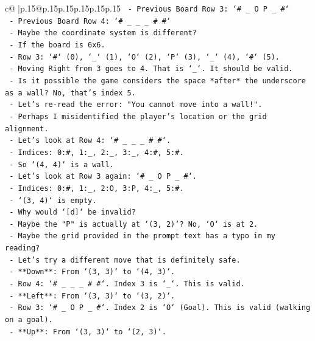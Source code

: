 \documentclass{article}
\begin{document}
{\begin{supertabular}{c@{$\;$}|p{.15\linewidth}@{}p{.15\linewidth}p{.15\linewidth}p{.15\linewidth}p{.15\linewidth}p{.15\linewidth}}
{{{\texttt{    {-} Previous Board Row 3: `\# \_ O P \_ \#`} \\
\texttt{    {-} Previous Board Row 4: `\# \_ \_ \_ \# \#`} \\
\texttt{  {-} Maybe the coordinate system is different?} \\
\texttt{    {-} If the board is 6x6.} \\
\texttt{    {-} Row 3: `\#` (0), `\_` (1), `O` (2), `P` (3), `\_` (4), `\#` (5).} \\
\texttt{    {-} Moving Right from 3 goes to 4. That is `\_`. It should be valid.} \\
\texttt{  {-} Is it possible the game considers the space *after* the underscore as a wall? No, that's index 5.} \\
\texttt{  {-} Let's re{-}read the error: "You cannot move into a wall!".} \\
\texttt{  {-} Perhaps I misidentified the player's location or the grid alignment.} \\
\texttt{  {-} Let's look at Row 4: `\# \_ \_ \_ \# \#`.} \\
\texttt{    {-} Indices: 0:\#, 1:\_, 2:\_, 3:\_, 4:\#, 5:\#.} \\
\texttt{    {-} So `(4, 4)` is a wall.} \\
\texttt{  {-} Let's look at Row 3 again: `\# \_ O P \_ \#`.} \\
\texttt{    {-} Indices: 0:\#, 1:\_, 2:O, 3:P, 4:\_, 5:\#.} \\
\texttt{    {-} `(3, 4)` is empty.} \\
\texttt{  {-} Why would `{[}d{]}` be invalid?} \\
\texttt{    {-} Maybe the "P" is actually at `(3, 2)`? No, `O` is at 2.} \\
\texttt{    {-} Maybe the grid provided in the prompt text has a typo in my reading?} \\
\texttt{    {-} Let's try a different move that is definitely safe.} \\
\texttt{    {-} **Down**: From `(3, 3)` to `(4, 3)`.} \\
\texttt{      {-} Row 4: `\# \_ \_ \_ \# \#`. Index 3 is `\_`. This is valid.} \\
\texttt{    {-} **Left**: From `(3, 3)` to `(3, 2)`.} \\
\texttt{      {-} Row 3: `\# \_ O P \_ \#`. Index 2 is `O` (Goal). This is valid (walking on a goal).} \\
\texttt{    {-} **Up**: From `(3, 3)` to `(2, 3)`.} \\
}}}
\end{supertabular}}
\end{document}
